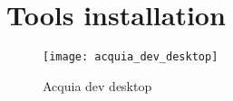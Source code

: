 \chapter{Tools installation}

\begin{figure}[p]
	\centering
	\texttt{[image: acquia\_dev\_desktop]}
	\caption{Acquia dev desktop}
	\label{fig:acquia_dev_desktop}
\end{figure}